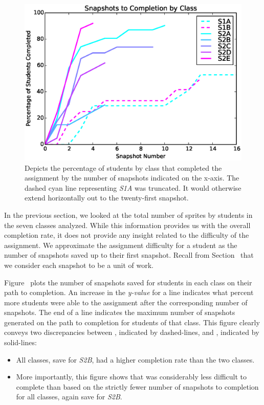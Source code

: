 \begin{figure}[!t]
\centering \includegraphics[width=5.25in]{graphs/snapshots_to_completion.eps}
\caption{Depicts the percentage of students by class that completed the
  assignment by the number of snapshots indicated on the x-axis. The dashed
  cyan line representing \emph{S1A} was truncated. It would otherwise extend
  horizontally out to the twenty-first snapshot.}
\end{figure}

In the previous section, we looked at the total number of sprites \caught{} by
students in the seven classes analyzed. While this information provides us with
the overall completion rate, it does not provide any insight related to the
difficulty of the assignment. We approximate the assignment difficulty for a
student as the number of snapshots saved up to their first \com{}
snapshot. Recall from Section~ that we consider each
snapshot to be a unit of work.

Figure~ plots the number of snapshots
saved for students in each class on their path to completion. An increase in
the \emph{y-value} for a line indicates what percent more students were able to
\com{} the assignment after the corresponding number of snapshots. The end of a
line indicates the maximum number of snapshots generated on the path to
completion for students of that class. This figure clearly conveys two
discrepancies between \sone{}, indicated by dashed-lines, and \stwo{},
indicated by solid-lines:

\begin{itemize}
\item All \stwo{} classes, save for \emph{S2B}, had a higher completion rate
  than the two \sone{} classes.
\item More importantly, this figure shows that \stwo{} was considerably less
  difficult to complete than \sone{} based on the strictly fewer number of
  snapshots to completion for all \stwo{} classes, again save for \emph{S2B}.
\end{itemize}

